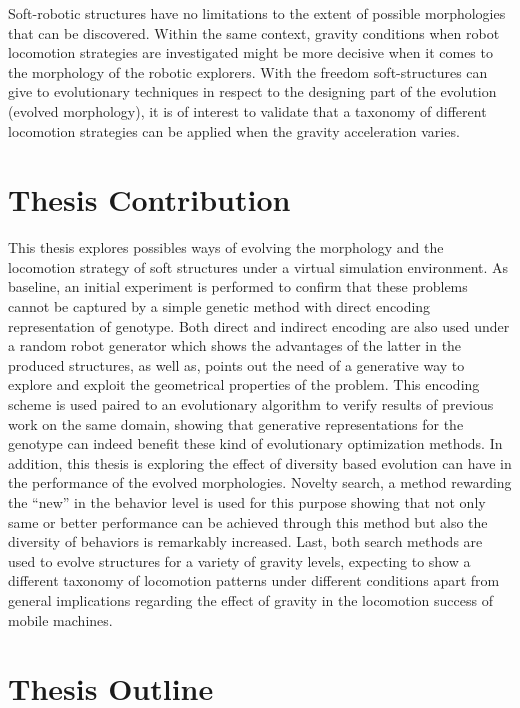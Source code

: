Soft-robotic structures have no limitations to the extent of possible morphologies that can be discovered.
Within the same context, gravity conditions when robot locomotion strategies are investigated might be more decisive when it comes to the morphology of the robotic explorers. With the freedom soft-structures can give to evolutionary techniques in respect to the designing part of the evolution (evolved morphology), it is of interest to validate that a taxonomy of different locomotion strategies can be applied when the gravity acceleration varies.



\section{Thesis Contribution}

This thesis explores possibles ways of evolving the morphology and the locomotion strategy of soft structures under a virtual simulation environment. As baseline, an initial experiment is performed to confirm that these problems cannot be captured by a simple genetic method with direct encoding representation of genotype. Both direct and indirect encoding are also used under a random robot generator which shows the advantages of the latter in the produced structures, as well as, points out the need of a generative way to explore and exploit the geometrical properties of the problem. This encoding scheme is used paired to an evolutionary algorithm to verify results of previous work on the same domain, showing that generative representations for the genotype can indeed benefit these kind of evolutionary optimization methods. In addition, this thesis is exploring the effect of diversity based evolution can have in the performance of the evolved morphologies. Novelty search, a method rewarding the ``new'' in the behavior level is used for this purpose showing that not only same or better performance can be achieved through this method but also the diversity of behaviors is remarkably increased. Last, both search methods are used to evolve structures for a variety of gravity levels, expecting to show a different taxonomy of locomotion patterns under different conditions apart from general implications regarding the effect of gravity in the locomotion success of mobile machines.






\section{Thesis Outline}

